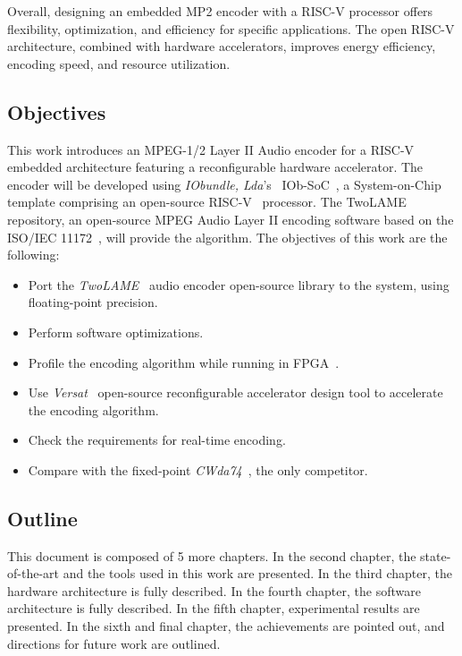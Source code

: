 Overall, designing an embedded MP2 encoder with a RISC-V processor offers flexibility, optimization, and efficiency for specific applications. The open RISC-V architecture, combined with hardware accelerators, improves energy efficiency, encoding speed, and resource utilization.

\subsection{Objectives}

This work introduces an MPEG-1/2 Layer II Audio encoder for a RISC-V embedded architecture
featuring a reconfigurable hardware accelerator. The encoder will be developed using \textit{IObundle, Lda}'s~\cite{iobundle} IOb-SoC~\cite{bib:iobsoc-github}, a System-on-Chip template comprising an open-source RISC-V~\cite{riscv} processor. The TwoLAME~\cite{twolamerepo} repository, an open-source MPEG Audio Layer II encoding software based on the ISO/IEC 11172~\cite{11172}, will provide the algorithm.
The objectives of this work are the following:

\begin{itemize}
    \item Port the \textit{TwoLAME}~\cite{bib:twolame} audio encoder open-source library to the system, using floating-point precision.
    \item Perform software optimizations.
    \item Profile the encoding algorithm while running in FPGA~\cite{fpga}.
    \item Use \textit{Versat}~\cite{bib:iobversat} open-source reconfigurable accelerator design tool to accelerate the encoding algorithm.
    \item Check the requirements for real-time encoding.
    \item Compare with the fixed-point \textit{CWda74}~\cite{CWda74}, the only competitor.
\end{itemize}

\subsection{Outline}

This document is composed of 5 more chapters. In the second chapter, the state-of-the-art and the tools used in this work are presented. In the third chapter, the hardware architecture is fully described. In the fourth chapter, the software architecture is fully described. In the fifth chapter, experimental results are presented. In the sixth and final chapter, the achievements are pointed out, and directions for future work are outlined.





